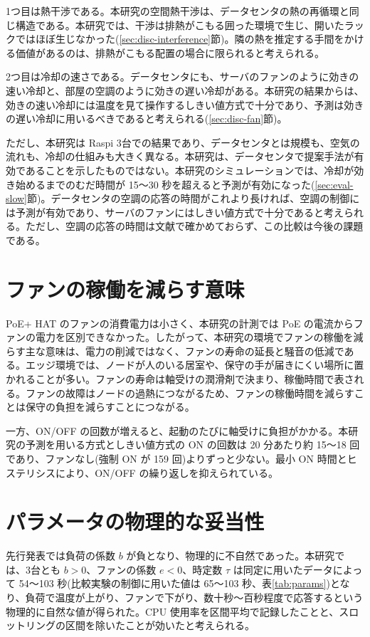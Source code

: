 1つ目は熱干渉である。本研究の空間熱干渉は、データセンタの熱の再循環\cite{moore2005cool,tang2008sensor}と同じ構造である。本研究では、干渉は排熱がこもる囲った環境で生じ、開いたラックではほぼ生じなかった(\ref{sec:disc-interference}節)。隣の熱を推定する手間をかける価値があるのは、排熱がこもる配置の場合に限られると考えられる。

2つ目は冷却の速さである。データセンタにも、サーバのファンのように効きの速い冷却と、部屋の空調のように効きの遅い冷却がある。本研究の結果からは、効きの速い冷却には温度を見て操作するしきい値方式で十分であり、予測は効きの遅い冷却に用いるべきであると考えられる(\ref{sec:disc-fan}節)。

ただし、本研究は Raspi 3台での結果であり、データセンタとは規模も、空気の流れも、冷却の仕組みも大きく異なる。本研究は、データセンタで提案手法が有効であることを示したものではない。本研究のシミュレーションでは、冷却が効き始めるまでのむだ時間が 15〜30 秒を超えると予測が有効になった(\ref{sec:eval-slow}節)。データセンタの空調の応答の時間がこれより長ければ、空調の制御には予測が有効であり、サーバのファンにはしきい値方式で十分であると考えられる。ただし、空調の応答の時間は文献で確かめておらず、この比較は今後の課題である。

\section{ファンの稼働を減らす意味}\label{sec:disc-fan-use}
PoE+ HAT のファンの消費電力は小さく、本研究の計測では PoE の電流からファンの電力を区別できなかった。したがって、本研究の環境でファンの稼働を減らす主な意味は、電力の削減ではなく、ファンの寿命の延長と騒音の低減である。エッジ環境では、ノードが人のいる居室や、保守の手が届きにくい場所に置かれることが多い。ファンの寿命は軸受けの潤滑剤で決まり、稼働時間で表される\cite{kim1996fanlife}。ファンの故障はノードの過熱につながるため、ファンの稼働時間を減らすことは保守の負担を減らすことにつながる。

一方、ON/OFF の回数が増えると、起動のたびに軸受けに負担がかかる。本研究の予測を用いる方式としきい値方式の ON の回数は 20 分あたり約 15〜18 回であり、ファンなし(強制 ON が 159 回)よりずっと少ない。最小 ON 時間とヒステリシスにより、ON/OFF の繰り返しを抑えられている。

\section{パラメータの物理的な妥当性}\label{sec:disc-params}
先行発表では負荷の係数 $b$ が負となり、物理的に不自然であった。本研究では、3台とも $b > 0$、ファンの係数 $e < 0$、時定数 $\tau$ は同定に用いたデータによって 54〜103 秒(比較実験の制御に用いた値は 65〜103 秒、表\ref{tab:params})となり、負荷で温度が上がり、ファンで下がり、数十秒〜百秒程度で応答するという物理的に自然な値が得られた。CPU 使用率を区間平均で記録したことと、スロットリングの区間を除いたことが効いたと考えられる。

